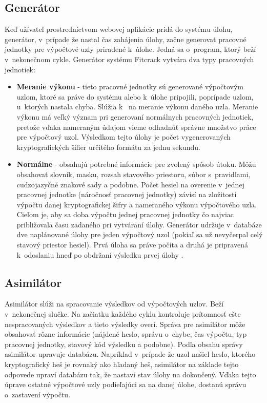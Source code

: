 \documentclass[slovak]{fitthesis}
\begin{document}
\subsection{Generátor}
Keď užívateľ prostredníctvom webovej aplikácie pridá do systému úlohu, generátor, v~prípade že nastal čas zahájenia úlohy, začne generovať pracovné jednotky pre výpočtové uzly priradené k~úlohe. Jedná sa o~program, ktorý beží v~nekonečnom cykle. Generátor systému Fitcrack vytvára dva typy pracovných jednotiek:
\begin{itemize}
    \item \textbf{Meranie výkonu} - tieto pracovné jednotky sú generované výpočtovým uzlom, ktoré sa práve do systému alebo k~úlohe pripojili, poprípade uzlom, u~ktorých nastala chyba. Slúžia k~ na meranie výkonu daného uzla. Meranie výkonu má veľký význam pri generovaní normálnych pracovných jednotiek, pretože vďaka nameraným údajom vieme odhadnúť správne množstvo práce pre výpočtový uzol. Výsledkom tejto úlohy je počet vygenerovaných kryptografických šifier určitého formátu za jednu sekundu. 
    \item \textbf{Normálne} - obsahujú potrebné informácie pre zvolený spôsob útoku. Môžu obsahovať slovník, masku, rozsah stavového priestoru, súbor s~pravidlami, cudzojazyčné znakové sady a podobne. Počet hesiel na overenie v~jednej pracovnej jednotke (náročnosť pracovnej jednotky) závisí na zložitosti výpočtu danej kryptografickej šifry a nameraného výkonu výpočtového uzla. Cieľom je, aby sa doba výpočtu jednej pracovnej jednotky čo najviac približovala času zadaného pri vytváraní úlohy. Generátor udržuje v~databáze dve naplánované úlohy pre jeden výpočtový uzol (pokiaľ sa už nevyčerpal celý stavový priestor hesiel). Prvá úloha sa práve počíta a druhá je pripravená k~odoslaniu hneď po obdržaní výsledku prvej úlohy \cite{EfficiencyDistributedPassword}.
\end{itemize}

\subsection{Asimilátor}
\label{asimilator}
Asimilátor slúži na spracovanie výsledkov od výpočtových uzlov. Beží v~nekonečnej slučke. Na začiatku každého cyklu kontroluje prítomnosť ešte nespracovaných výsledkov a tieto výsledky overí. Správa pre asimilátor môže obsahovať rôzne informácie (nájdené heslo, správu o~chybe, čas výpočtu, typ pracovnej jednotky, stavový kód výsledku a podobne). Podľa obsahu správy asimilátor upravuje databázu. Napríklad v~prípade že uzol našiel heslo, ktorého kryptografický heš je rovnaký ako hľadaný heš, asimilátor na základe tejto odpovede upraví databázu tak, že nastaví stav úlohy na dokončený. Vďaka tejto úprave ostatné výpočtové uzly podieľajúci sa na danej úlohe, dostanú správu o~zastavení výpočtu.
\end{document}
